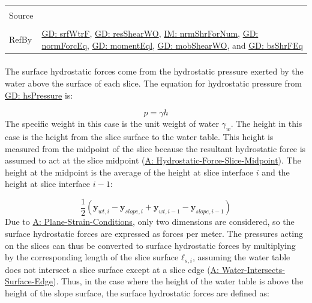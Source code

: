 \documentclass[12pt]{article}
\begin{document}
\begin{minipage}{\textwidth}
\begin{tabular}{>{\raggedright}p{}>{\raggedright\arraybackslash}p{}}
\\ \midrule \\
Source & \cite{fredlund1977}
         
\\ \midrule \\
RefBy & \hyperref[GD:srfWtrF]{GD: srfWtrF}, \hyperref[GD:resShearWO]{GD: resShearWO}, \hyperref[IM:nrmShrForNum]{IM: nrmShrForNum}, \hyperref[GD:normForcEq]{GD: normForcEq}, \hyperref[GD:momentEql]{GD: momentEql}, \hyperref[GD:mobShearWO]{GD: mobShearWO}, and \hyperref[GD:bsShrFEq]{GD: bsShrFEq}
        
\\ \bottomrule
\end{tabular}
\end{minipage}
\paragraph{}
\label{GD:srfWtrFDeriv}
The surface hydrostatic forces come from the hydrostatic pressure exerted by the water above the surface of each slice. The equation for hydrostatic pressure from \hyperref[GD:hsPressure]{GD: hsPressure} is:

\begin{displaymath}
p=γ h
\end{displaymath}
The specific weight in this case is the unit weight of water ${γ_{w}}$. The height in this case is the height from the slice surface to the water table. This height is measured from the midpoint of the slice because the resultant hydrostatic force is assumed to act at the slice midpoint (\hyperref[assumpHFSM]{A: Hydrostatic-Force-Slice-Midpoint}). The height at the midpoint is the average of the height at slice interface $i$ and the height at slice interface $i-1$:

\begin{displaymath}
\frac{1}{2} \left({\mathbf{y}_{wt,i}}-{\mathbf{y}_{slope,i}}+{\mathbf{y}_{wt,i-1}}-{\mathbf{y}_{slope,i-1}}\right)
\end{displaymath}
Due to \hyperref[assumpPSC]{A: Plane-Strain-Conditions}, only two dimensions are considered, so the surface hydrostatic forces are expressed as forces per meter. The pressures acting on the slices can thus be converted to surface hydrostatic forces by multiplying by the corresponding length of the slice surface ${\mathbf{ℓ}_{s,i}}$, assuming the water table does not intersect a slice surface except at a slice edge (\hyperref[assumpWISE]{A: Water-Intersects-Surface-Edge}). Thus, in the case where the height of the water table is above the height of the slope surface, the surface hydrostatic forces are defined as:
\end{document}
